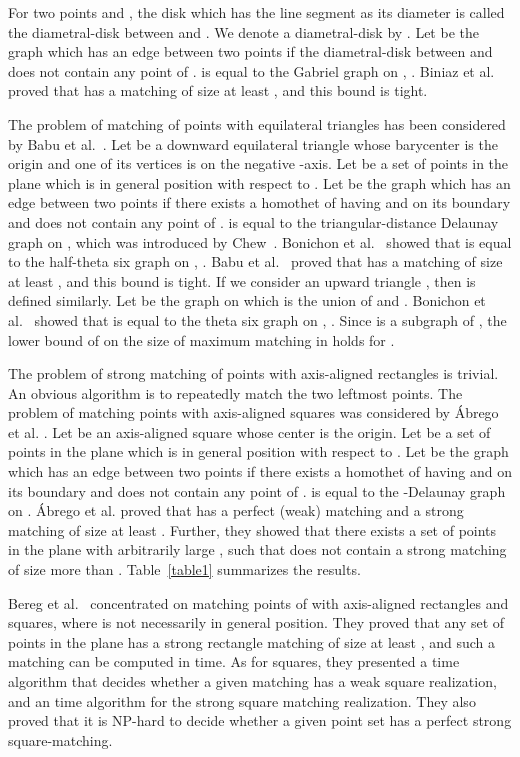\documentclass[11pt,a4paper]{article}
\begin{document}
For two points  and , the disk which has the line segment  as its diameter is called the diametral-disk between  and . We denote a diametral-disk by . Let  be the graph which has an edge between two points  if the diametral-disk between  and  does not contain any point of .  is equal to the Gabriel graph on , . Biniaz et al.~\cite{Biniaz2014} proved that  has a matching of size at least , and this bound is tight.

The problem of matching of points with equilateral triangles has been considered by Babu et al.~\cite{Babu2014}.
Let  be a downward equilateral triangle  whose barycenter is the origin and one of its vertices is on the negative -axis. Let  be a set of  points in the plane which is in general position with respect to . Let  be the graph which has an edge between two points  if there exists a homothet of  having  and  on its boundary and does not contain any point of .  is equal to the triangular-distance Delaunay graph on , which was introduced by Chew~\cite{Chew1989}. Bonichon et al.~\cite{Bonichon2010} showed that  is equal to the half-theta six graph on , . Babu et al.~\cite{Babu2014} proved that  has a matching of size at least , and this bound is tight. If we consider an upward triangle , then  is defined similarly. Let  be the graph on  which is the union of  and . Bonichon et al.~\cite{Bonichon2010} showed that  is equal to the theta six graph on , . Since  is a subgraph of , the lower bound of  on the size of maximum matching in  holds for .  

The problem of strong matching of points with axis-aligned rectangles is trivial. An obvious algorithm is to repeatedly match the two leftmost points. The problem of matching points with axis-aligned squares was considered by \'{A}brego et al. \cite{Abrego2009}.
Let  be an axis-aligned square  whose center is the origin. Let  be a set of  points in the plane which is in general position with respect to . Let  be the graph which has an edge between two points  if there exists a homothet of  having  and  on its boundary and does not contain any point of .  is equal to the -Delaunay graph on . \'{A}brego et al. \cite{Abrego2004, Abrego2009} proved that  has a perfect (weak) matching and a strong matching of size at least . Further, they showed that there exists a set  of  points in the plane with arbitrarily large , such that  does not contain a strong matching of size more than . Table~\ref{table1} summarizes the results.

Bereg et al.~\cite{Bereg2009} concentrated on matching points of  with axis-aligned rectangles and squares, where  is not necessarily in general position. 
They proved that any set of  points in the plane has a strong rectangle matching of size at least , and such a matching can be computed in  time. As for squares, they presented a  time algorithm that decides whether a given matching has a weak square realization, 
and an  time algorithm for the strong square matching realization. They also proved that it is NP-hard to decide whether a given point set has a perfect strong square-matching. 
\end{document}
